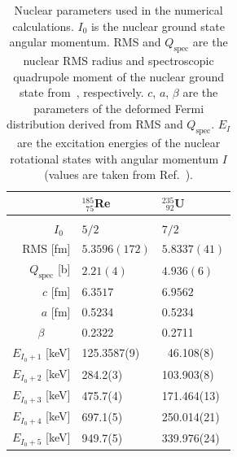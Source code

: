 \begin{table}[b]
\caption{\label{tab:params}%
Nuclear parameters used in the numerical calculations. $I_0$ is the nuclear ground state angular momentum. RMS and $Q_\text{spec}$ are the nuclear RMS radius and spectroscopic quadrupole moment of the nuclear ground state from~\cite{Angeli2013,Stone2005}, respectively. $c$, $a$, $\beta$ are the parameters of the deformed Fermi distribution derived from RMS and $Q_\text{spec}$. $E_{I}$ are the excitation energies of the nuclear rotational states with angular momentum $I$ (values are taken from Ref.~\cite{ENSDF}).}
\centering
\begin{tabular}{r|ll}
& $^{185}_{\phantom{1}75}$Re & $^{235}_{\phantom{1}92}$U\\ \hline \\[-10pt]
$I_0$ \hfill$\phantom{.}$ & $5/2$ & $7/2$ \\
RMS \hfill[fm] & $5.3596(172)$ & $5.8337(41)$ \\
$Q_\text{spec}$ \hfill[b] & $2.21(4)\phantom{111}$ & $4.936(6)\phantom{1}$ \\
$c$ \hfill[fm] & $6.3517$ & $6.9562$ \\
$a$ \hfill[fm] & 0.5234 & 0.5234 \\
$\beta$ \hfill$\phantom{.abc.}$ & 0.2322 & 0.2711 \\[7pt]
$E_{I_0 + 1}$ \hfill[keV] & 125.3587(9) &  $\phantom{1}$46.108(8) \\
$E_{I_0 + 2}$ \hfill[keV] & 284.2(3) & 103.903(8) \\
$E_{I_0 + 3}$ \hfill[keV] & 475.7(4) & 171.464(13) \\
$E_{I_0 + 4}$ \hfill[keV] & 697.1(5) & 250.014(21) \\
$E_{I_0 + 5}$ \hfill[keV] & 949.7(5) & 339.976(24) \\
\end{tabular}
\end{table}
%

